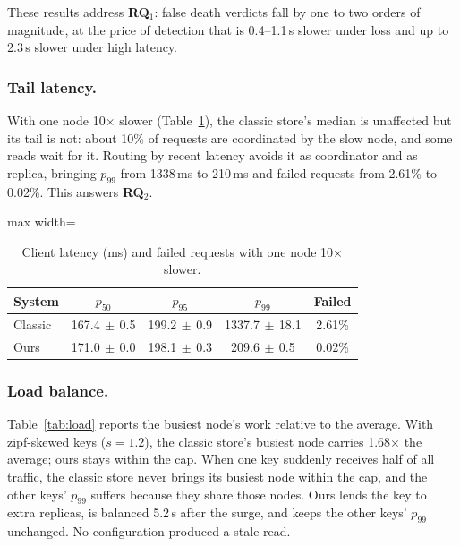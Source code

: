 \documentclass[sigconf,nonacm]{acmart}
\newcommand{\win}[1]{\textcolor{win}{#1}}
\newcommand{\loss}[1]{\textcolor{loss}{#1}}
\newcommand{\pmsd}[2]{#1{\scriptsize$\,\pm\,$#2}}
\begin{document}
These results address \textbf{RQ}$_1$: false death verdicts fall by one to two orders of magnitude, at the price of detection that is 0.4--1.1\,s slower under loss and up to 2.3\,s slower under high latency.

\subsubsection{Tail latency.} With one node 10$\times$ slower (Table~\ref{tab:slow}), the classic store's median is unaffected but its tail is not: about 10\% of requests are coordinated by the slow node, and some reads wait for it. Routing by recent latency avoids it as coordinator and as replica, bringing $p_{99}$ from 1338\,ms to 210\,ms and failed requests from 2.61\% to 0.02\%. This answers \textbf{RQ}$_2$.

\begin{table}[h]
\caption{Client latency (ms) and failed requests with one node 10$\times$ slower.}
\label{tab:slow}
\small
\begin{adjustbox}{max width=\columnwidth}
\begin{tabular}{lcccc}
\toprule
\textbf{System} & $p_{50}$ & $p_{95}$ & $p_{99}$ & \textbf{Failed} \\
\midrule
Classic & \pmsd{167.4}{0.5} & \pmsd{199.2}{0.9} & \pmsd{1337.7}{18.1} & 2.61\% \\
Ours & \loss{\pmsd{171.0}{0.0}} & \win{\pmsd{198.1}{0.3}} & \win{\pmsd{209.6}{0.5}} & \win{0.02\%} \\
\bottomrule
\end{tabular}
\end{adjustbox}
\end{table}

\subsubsection{Load balance.} Table~\ref{tab:load} reports the busiest node's work relative to the average. With zipf-skewed keys ($s = 1.2$), the classic store's busiest node carries 1.68$\times$ the average; ours stays within the cap. When one key suddenly receives half of all traffic, the classic store never brings its busiest node within the cap, and the other keys' $p_{99}$ suffers because they share those nodes. Ours lends the key to extra replicas, is balanced 5.2\,s after the surge, and keeps the other keys' $p_{99}$ unchanged. No configuration produced a stale read.
\end{document}
